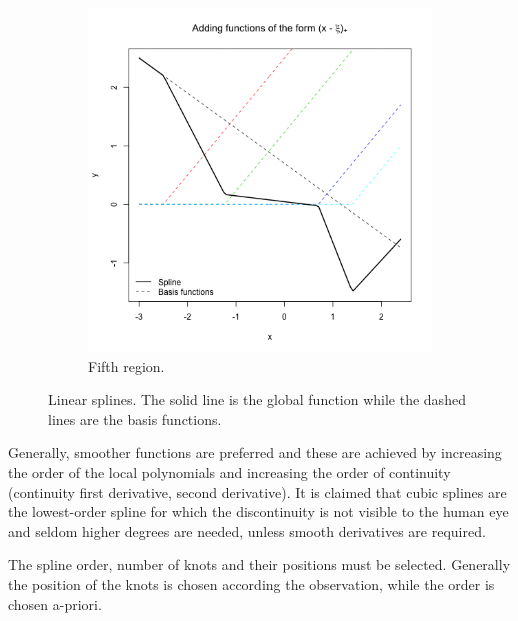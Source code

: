 \documentclass[12pt, letterpaper]{article}
\theoremstyle{definition}
\begin{document}
\begin{figure}\ContinuedFloat
\begin{subfigure}{0.49\textwidth}
\centering
\includegraphics[width=1\linewidth]{img/spline_linear/100}
\caption{Fifth region.}
\end{subfigure}
\caption{Linear splines. The solid line is the global function while the dashed lines are the basis functions.}
\label{spline_linear}
\end{figure}

Generally, smoother functions are preferred and these are achieved by increasing the order of the local polynomials and increasing the order of continuity (continuity first derivative, second derivative). It is claimed that cubic splines are the lowest-order spline for which the discontinuity is not visible to the human eye and seldom higher degrees are needed, unless smooth derivatives are required.

The spline order, number of knots and their positions must be selected. Generally the position of the knots is chosen according the observation, while the order is chosen a-priori.
\end{document}
